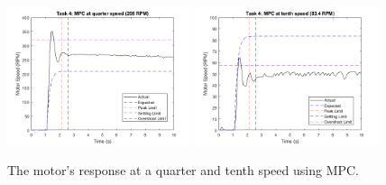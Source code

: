 \documentclass[11pt, onecolumn]{article}
\begin{document}
\begin{figure}[h!]
    \centering
    \includegraphics[width=0.48\textwidth]{q4-g3.png} \includegraphics[width=0.48\textwidth]{q4-g4.png}
    \caption{The motor's response at a quarter and tenth speed using MPC.}
    \label{fig:q4-g2}
\end{figure}
\end{document}
